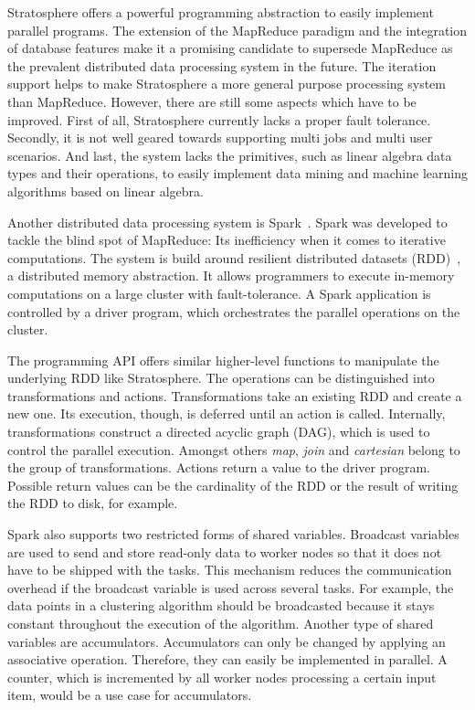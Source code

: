 Stratosphere offers a powerful programming abstraction to easily implement parallel programs.
The extension of the MapReduce paradigm and the integration of database features make it a promising candidate to supersede MapReduce as the prevalent distributed data processing system in the future.
The iteration support helps to make Stratosphere a more general purpose processing system than MapReduce.
However, there are still some aspects which have to be improved.
First of all, Stratosphere currently lacks a proper fault tolerance.
Secondly, it is not well geared towards supporting multi jobs and multi user scenarios.
And last, the system lacks the primitives, such as linear algebra data types and their operations, to easily implement data mining and machine learning algorithms based on linear algebra.

Another distributed data processing system is Spark~\cite{zaharia:2010a}.
Spark was developed to tackle the blind spot of MapReduce: Its inefficiency when it comes to iterative computations.
The system is build around resilient distributed datasets (RDD)~\cite{zaharia:2012a}, a distributed memory abstraction.
It allows programmers to execute in-memory computations on a large cluster with fault-tolerance.
A Spark application is controlled by a driver program, which orchestrates the parallel operations on the cluster.

The programming API offers similar higher-level functions to manipulate the underlying RDD like Stratosphere.
The operations can be distinguished into transformations and actions.
Transformations take an existing RDD and create a new one. 
Its execution, though, is deferred until an action is called.
Internally, transformations construct a directed acyclic graph (DAG), which is used to control the parallel execution.
Amongst others \emph{map}, \emph{join} and \emph{cartesian} belong to the group of transformations.
Actions return a value to the driver program.
Possible return values can be the cardinality of the RDD or the result of writing the RDD to disk, for example.

Spark also supports two restricted forms of shared variables.
Broadcast variables are used to send and store read-only data to worker nodes so that it does not have to be shipped with the tasks.
This mechanism reduces the communication overhead if the broadcast variable is used across several tasks.
For example, the data points in a \kmeans clustering algorithm should be broadcasted because it stays constant throughout the execution of the algorithm.
Another type of shared variables are accumulators.
Accumulators can only be changed by applying an associative operation.
Therefore, they can easily be implemented in parallel.
A counter, which is incremented by all worker nodes processing a certain input item, would be a use case for accumulators.

